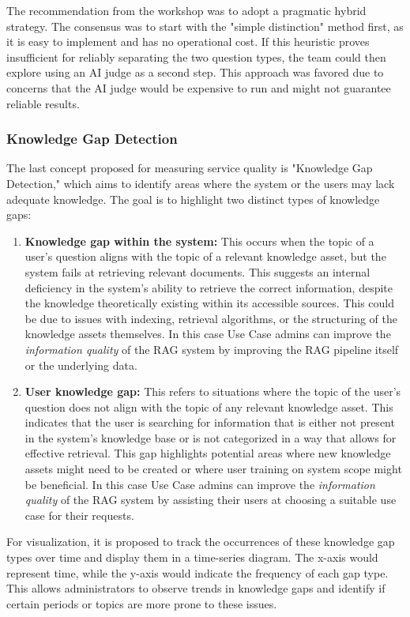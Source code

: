 \documentclass[
	english,
	ruledheaders=section,%
	class=report,%
	thesis={type=bachelor},%
	accentcolor=1b,%
	custommargins=true,%
	marginpar=false,%
	parskip=half-,%
	fontsize=11pt,%
	DIV=14,
]{tudapub}
\begin{document}
The recommendation from the workshop was to adopt a pragmatic hybrid strategy. The consensus was to start with the "simple distinction" method first, as it is easy to implement and has no operational cost. If this heuristic proves insufficient for reliably separating the two question types, the team could then explore using an AI judge as a second step. This approach was favored due to concerns that the AI judge would be expensive to run and might not guarantee reliable results.
\subsubsection{Knowledge Gap Detection}
The last concept proposed for measuring service quality is "Knowledge Gap Detection," which aims to identify areas where the system or the users may lack adequate knowledge. The goal is to highlight two distinct types of knowledge gaps:

\begin{enumerate}
    \item \textbf{Knowledge gap within the system:} This occurs when the topic of a user's question aligns with the topic of a relevant knowledge asset, but the system fails at retrieving relevant documents. This suggests an internal deficiency in the system's ability to retrieve the correct information, despite the knowledge theoretically existing within its accessible sources. This could be due to issues with indexing, retrieval algorithms, or the structuring of the knowledge assets themselves. In this case Use Case admins can improve the \textit{information quality} of the RAG system by improving the RAG pipeline itself or the underlying data.
    \item \textbf{User knowledge gap:} This refers to situations where the topic of the user's question does not align with the topic of any relevant knowledge asset. This indicates that the user is searching for information that is either not present in the system's knowledge base or is not categorized in a way that allows for effective retrieval. This gap highlights potential areas where new knowledge assets might need to be created or where user training on system scope might be beneficial. In this case Use Case admins can improve the \textit{information quality} of the RAG system by assisting their users at choosing a suitable use case for their requests.
\end{enumerate}

For visualization, it is proposed to track the occurrences of these knowledge gap types over time and display them in a time-series diagram. The x-axis would represent time, while the y-axis would indicate the frequency of each gap type. This allows administrators to observe trends in knowledge gaps and identify if certain periods or topics are more prone to these issues.
\end{document}
